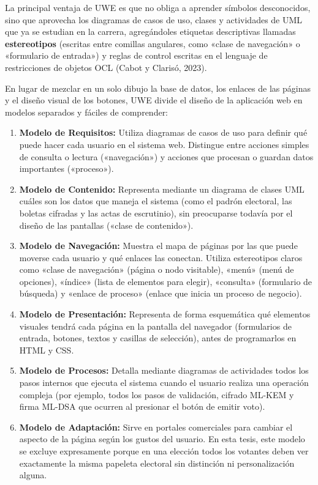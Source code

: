 La principal ventaja de UWE es que no obliga a aprender símbolos desconocidos, sino que aprovecha los diagramas de casos de uso, clases y actividades de UML que ya se estudian en la carrera, agregándoles etiquetas descriptivas llamadas \textbf{estereotipos} (escritas entre comillas angulares, como «clase de navegación» o «formulario de entrada») y reglas de control escritas en el lenguaje de restricciones de objetos OCL (Cabot y Clarisó, 2023).

En lugar de mezclar en un solo dibujo la base de datos, los enlaces de las páginas y el diseño visual de los botones, UWE divide el diseño de la aplicación web en modelos separados y fáciles de comprender:

\begin{enumerate}
	\item \textbf{Modelo de Requisitos:} Utiliza diagramas de casos de uso para definir qué puede hacer cada usuario en el sistema web. Distingue entre acciones simples de consulta o lectura («navegación») y acciones que procesan o guardan datos importantes («proceso»).

	\item \textbf{Modelo de Contenido:} Representa mediante un diagrama de clases UML cuáles son los datos que maneja el sistema (como el padrón electoral, las boletas cifradas y las actas de escrutinio), sin preocuparse todavía por el diseño de las pantallas («clase de contenido»).

	\item \textbf{Modelo de Navegación:} Muestra el mapa de páginas por las que puede moverse cada usuario y qué enlaces las conectan. Utiliza estereotipos claros como «clase de navegación» (página o nodo visitable), «menú» (menú de opciones), «índice» (lista de elementos para elegir), «consulta» (formulario de búsqueda) y «enlace de proceso» (enlace que inicia un proceso de negocio).

	\item \textbf{Modelo de Presentación:} Representa de forma esquemática qué elementos visuales tendrá cada página en la pantalla del navegador (formularios de entrada, botones, textos y casillas de selección), antes de programarlos en HTML y CSS.

	\item \textbf{Modelo de Procesos:} Detalla mediante diagramas de actividades todos los pasos internos que ejecuta el sistema cuando el usuario realiza una operación compleja (por ejemplo, todos los pasos de validación, cifrado ML-KEM y firma ML-DSA que ocurren al presionar el botón de emitir voto).

	\item \textbf{Modelo de Adaptación:} Sirve en portales comerciales para cambiar el aspecto de la página según los gustos del usuario. En esta tesis, este modelo se excluye expresamente porque en una elección todos los votantes deben ver exactamente la misma papeleta electoral sin distinción ni personalización alguna.
\end{enumerate}
